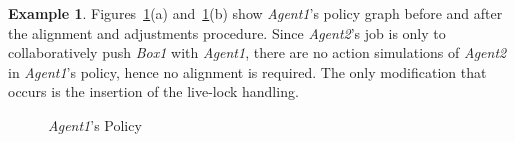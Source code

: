\documentclass[letterpaper]{article} %
\theoremstyle{definition}
\newtheorem{example}{Example}
\newcommand{\commentout}[1]{}
\begin{document}
\begin{example}
Figures~\ref{Fig:Alignment}(a) and~\ref{Fig:Alignment}(b) show \emph{Agent1}'s policy graph before and after the alignment and adjustments procedure.
Since \emph{Agent2}'s job is only to collaboratively push \emph{Box1} with \emph{Agent1}, there are no action simulations of \emph{Agent2} in \emph{Agent1}'s policy, hence no alignment is required. The only modification that occurs is the insertion of the live-lock handling.


\begin{figure}
    \centering
      \hfill
\caption{\label{Fig:Alignment} \emph{Agent1}'s Policy}
\end{figure}



\end{example}
\end{document}
